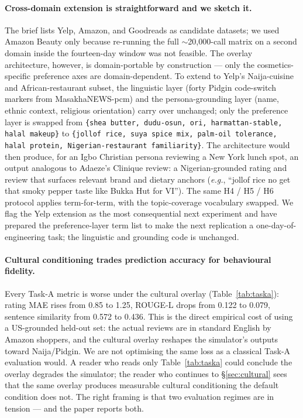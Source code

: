 \documentclass[8pt,twocolumn,a4paper]{extarticle}
\begin{document}
\paragraph{Cross-domain extension is straightforward and we sketch it.}
The brief lists Yelp, Amazon, and Goodreads as candidate datasets; we used Amazon Beauty only because re-running the full $\sim$20{,}000-call matrix on a second domain inside the fourteen-day window was not feasible. The overlay architecture, however, is domain-portable by construction --- only the cosmetics-specific preference axes are domain-dependent. To extend to Yelp's Naija-cuisine and African-restaurant subset, the linguistic layer (forty Pidgin code-switch markers from MasakhaNEWS-pcm) and the persona-grounding layer (name, ethnic context, religious orientation) carry over unchanged; only the preference layer is swapped from \texttt{\{shea butter, dudu-osun, ori, harmattan-stable, halal makeup\}} to \texttt{\{jollof rice, suya spice mix, palm-oil tolerance, halal protein, Nigerian-restaurant familiarity\}}. The architecture would then produce, for an Igbo Christian persona reviewing a New York lunch spot, an output analogous to Adaeze's Clinique review: a Nigerian-grounded rating and review that surfaces relevant brand and dietary anchors (\emph{e.g.}, ``jollof rice no get that smoky pepper taste like Bukka Hut for VI''). The same H4 / H5 / H6 protocol applies term-for-term, with the topic-coverage vocabulary swapped. We flag the Yelp extension as the most consequential next experiment and have prepared the preference-layer term list to make the next replication a one-day-of-engineering task; the linguistic and grounding code is unchanged.

\paragraph{Cultural conditioning trades prediction accuracy for behavioural fidelity.}
Every Task-A metric is worse under the cultural overlay (Table~\ref{tab:taska}): rating MAE rises from 0.85 to 1.25, ROUGE-L drops from 0.122 to 0.079, sentence similarity from 0.572 to 0.436. This is the direct empirical cost of using a US-grounded held-out set: the actual reviews are in standard English by Amazon shoppers, and the cultural overlay reshapes the simulator's outputs toward Naija/Pidgin. We are not optimising the same loss as a classical Task-A evaluation would. A reader who reads only Table~\ref{tab:taska} could conclude the overlay degrades the simulator; the reader who continues to \S\ref{sec:cultural} sees that the same overlay produces measurable cultural conditioning the default condition does not. The right framing is that two evaluation regimes are in tension --- and the paper reports both.
\end{document}
